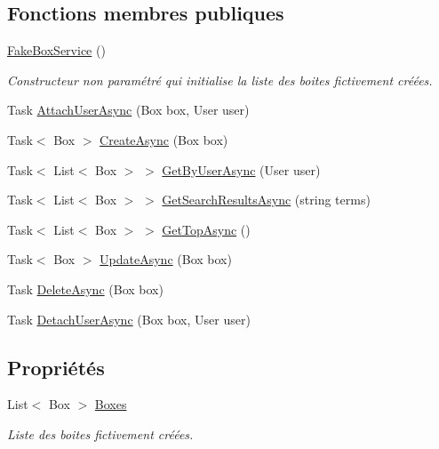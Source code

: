 \subsection*{Fonctions membres publiques}
\begin{DoxyCompactItemize}
\item 
\hyperlink{class_boxes_1_1_tests_1_1_mock_1_1_services_1_1_fake_box_service_ae1e766e11e7021f30f6d65fe8be5c2d4}{Fake\+Box\+Service} ()
\begin{DoxyCompactList}\small\item\em Constructeur non paramétré qui initialise la liste des boites fictivement créées. \end{DoxyCompactList}\item 
Task \hyperlink{class_boxes_1_1_tests_1_1_mock_1_1_services_1_1_fake_box_service_abf7f2b2aa828502c97cdfe5e4ded4385}{Attach\+User\+Async} (Box box, User user)
\item 
Task$<$ Box $>$ \hyperlink{class_boxes_1_1_tests_1_1_mock_1_1_services_1_1_fake_box_service_a5c786507b63fd61dfdbaa2e78279884b}{Create\+Async} (Box box)
\item 
Task$<$ List$<$ Box $>$ $>$ \hyperlink{class_boxes_1_1_tests_1_1_mock_1_1_services_1_1_fake_box_service_a66667dfe33b89e4711ad39d1aa21f6d6}{Get\+By\+User\+Async} (User user)
\item 
Task$<$ List$<$ Box $>$ $>$ \hyperlink{class_boxes_1_1_tests_1_1_mock_1_1_services_1_1_fake_box_service_a32fa7ee58f8832c0d2a50aa3d5a16ae7}{Get\+Search\+Results\+Async} (string terms)
\item 
Task$<$ List$<$ Box $>$ $>$ \hyperlink{class_boxes_1_1_tests_1_1_mock_1_1_services_1_1_fake_box_service_a3e1e5288bf9e004117ae1e51fcff732f}{Get\+Top\+Async} ()
\item 
Task$<$ Box $>$ \hyperlink{class_boxes_1_1_tests_1_1_mock_1_1_services_1_1_fake_box_service_aef2d07809b5d9c4f1943ffba8d45c6c4}{Update\+Async} (Box box)
\item 
Task \hyperlink{class_boxes_1_1_tests_1_1_mock_1_1_services_1_1_fake_box_service_ae28d6ad5177e6ca1b6f8c0fbfc6e6370}{Delete\+Async} (Box box)
\item 
Task \hyperlink{class_boxes_1_1_tests_1_1_mock_1_1_services_1_1_fake_box_service_afc335b64bc641c738825851b605494a2}{Detach\+User\+Async} (Box box, User user)
\end{DoxyCompactItemize}
\subsection*{Propriétés}
\begin{DoxyCompactItemize}
\item 
List$<$ Box $>$ \hyperlink{class_boxes_1_1_tests_1_1_mock_1_1_services_1_1_fake_box_service_a3569dfb32a10167dcb57b87991f8e958}{Boxes}
\begin{DoxyCompactList}\small\item\em Liste des boites fictivement créées. \end{DoxyCompactList}\end{DoxyCompactItemize}


